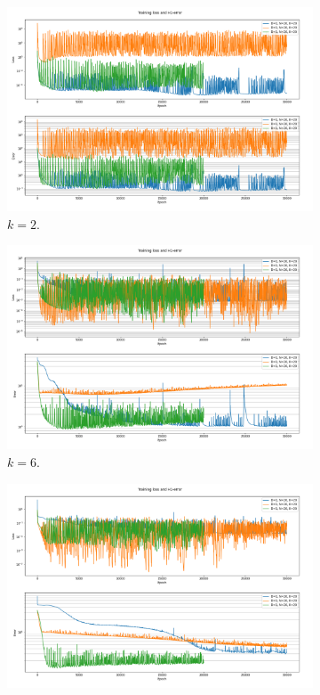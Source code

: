 \begin{figure}[h!]
    \centering
    \begin{subfigure}[b]{0.48\textwidth}
        \includegraphics[width=\textwidth]{img/VPINN-Comparison-lsinitk2.png}
        \caption{$k=2$.}
        \label{fig:vpinnslsinitk2}
    \end{subfigure}
    \hfill
    \begin{subfigure}[b]{0.48\textwidth}
        \includegraphics[width=\textwidth]{img/VPINN-Comparison-lsinitk6.png}
        \caption{$k=6$.}
        \label{fig:vpinnslsinitk6}
    \end{subfigure}
    \vfill
    \begin{subfigure}[b]{0.48\textwidth}
        \includegraphics[width=\textwidth]{img/VPINN-Comparison-lsinitk8.png}

\end{subfigure}
\end{figure}
